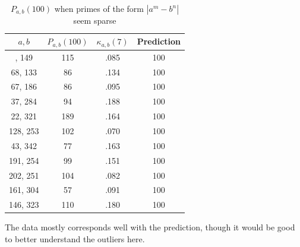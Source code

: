 \documentclass[12pt, a4paper,  reqno, english]{amsart}%
\numberwithin{equation}{section}
\theoremstyle{definition}
\begin{document}
 \begin{table}[ht]
\begin{center}
\begin{tabular}{|  c | c | c c  | }
\hline\newline
 $a,b$  &  $P_{a,b}(100)$  & $\kappa_{a,b}(7)$ & Prediction \\
\hline\newline
26, 149 &  115  & .085    &  100   \\
68,  133 &  86 & .134    &   100  \\
67,  186 &  86 &  .095   &   100   \\
 37, 284 &  94 &  .188   &   100   \\
 22, 321 & 189 & .164 &   100   \\
128, 253 &  102    & .070 & 100\\
 43, 342 & 77 & .163 & 100\\
191, 254 &   99   & .151 & 100\\
202, 251 &  104    & .082 & 100\\
161, 304 &  57    & .091 & 100\\
146, 323 &110 & .180 & 100\\
\hline 
\end{tabular}
    \end{center} \smallskip   
       \caption{$P_{a,b}(100)$ when primes of the form $|a^m-b^n|$ seem sparse}
    \end{table}  
    
The data mostly corresponds well with the prediction, though it would be good to better understand the outliers here.   

    


 
 
\end{document}
